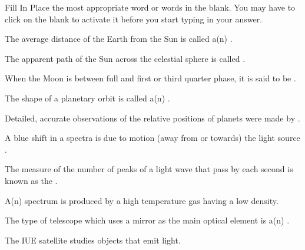 \begin{commemnt}
    Fill In
    Place the most appropriate word or words in the blank. You may have to click on the blank to activate it before you start typing in your answer.
     
    The average distance of the Earth from the Sun is called a(n) .

    The apparent path of the Sun across the celestial sphere is called .

    When the Moon is between full and first or third quarter phase, it is said to be .

    The shape of a planetary orbit is called a(n) .

    Detailed, accurate observations of the relative positions of planets were made by .

    A blue shift in a spectra is due to motion (away from or towards) the light source .

    The measure of the number of peaks of a light wave that pass by each second is known as the .

    A(n) spectrum is produced by a high temperature gas having a low density.

    The type of telescope which uses a mirror as the main optical element is a(n) .

    The IUE satellite studies objects that emit light.
\end{commemnt}

\endinput



